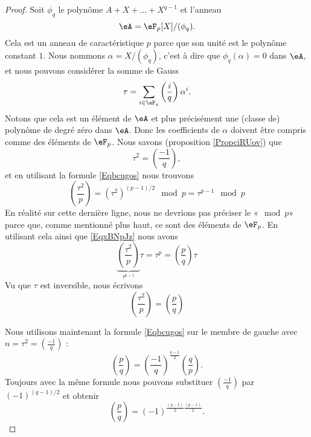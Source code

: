 \begin{proof}
    Soit \( \phi_q\) le polynôme \( A+X+\ldots+X^{q-1}\) et l'anneau
    \begin{equation}
        \eA=\eF_p[X]/(\phi_q).
    \end{equation}
    Cela est un anneau de caractéristique \( p\) parce que son unité est le polynôme constant \( 1\). Nous nommons \( \alpha=X/(\phi_q)\), c'est à dire que \( \phi_q(\alpha)=0\) dans \( \eA\), et nous pouvons considérer la somme de Gauss
    \begin{equation}
        \tau=\sum_{i\in \eF_q}\left(\frac{i}{q}\right)\alpha^i.
    \end{equation}
    Notons que cela est un élément de \( \eA\) et plus précisément une (classe de) polynôme de degré zéro dans \( \eA\). Donc les coefficients de \( \alpha\) doivent être compris comme des éléments de \( \eF_p\).
    Nous savons (proposition \ref{PropciRUov}) que 
    \begin{equation}
        \tau^2=\left(\frac{-1}{q}\right),
    \end{equation}
    et en utilisant la formule \eqref{Eqbcugos} nous trouvons
    \begin{equation}
        \left(\frac{\tau^2}{p}\right)=(\tau^2)^{(p-1)/2}\mod p=\tau^{p-1}\mod p
    \end{equation}
    En réalité sur cette dernière ligne, nous ne devrions pas préciser le «\( \mod p\)» parce que, comme mentionné plus haut, ce sont des éléments de \( \eF_p\). En utilisant cela ainsi que \eqref{EqxBNpJz} nous avons
    \begin{equation}
        \underbrace{\left(\frac{\tau^2}{p}\right)}_{\tau^{p-1}}\tau=\tau^p=\left(\frac{p}{q}\right)\tau
    \end{equation}
    Vu que \( \tau\) est inversible, nous écrivons
    \begin{equation}
        \left(\frac{\tau^2}{p}\right)=\left(\frac{p}{q}\right)
    \end{equation}

    Nous utilisons maintenant la formule \eqref{Eqbcugos} sur le membre de gauche avec \( n=\tau^2=\left(\frac{-1}{q}\right)\) :
    \begin{equation}
        \left(\frac{p}{q}\right)=\left(\frac{-1}{q}\right)^{\frac{ q-1 }{2}}\left(\frac{q}{p}\right).
    \end{equation}
    Toujours avec la même formule nous pouvons substituer \( \left(\frac{-1}{q}\right)\) par \( (-1)^{(q-1)/2}\) et obtenir
    \begin{equation}
        \left(\frac{p}{q}\right)=(-1)^{\frac{ (q-1) }{2}\frac{ (p-1) }{2}}.
    \end{equation}

\end{proof}


